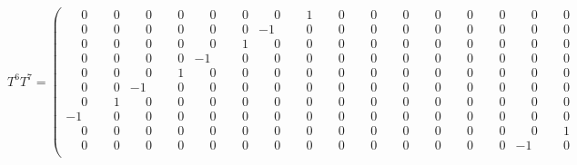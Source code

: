 \documentclass[10pt]{article}
\begin{document}
\[
T^{6}T^{7} = \left(\begin{smallmatrix}
\phantom{-}0 & \phantom{-}0 & \phantom{-}0 & \phantom{-}0 & \phantom{-}0 & \phantom{-}0 & \phantom{-}0 & \phantom{-}1 & \phantom{-}0 & \phantom{-}0 & \phantom{-}0 & \phantom{-}0 & \phantom{-}0 & \phantom{-}0 & \phantom{-}0 & \phantom{-}0 \\
\phantom{-}0 & \phantom{-}0 & \phantom{-}0 & \phantom{-}0 & \phantom{-}0 & \phantom{-}0 & -1 & \phantom{-}0 & \phantom{-}0 & \phantom{-}0 & \phantom{-}0 & \phantom{-}0 & \phantom{-}0 & \phantom{-}0 & \phantom{-}0 & \phantom{-}0 \\
\phantom{-}0 & \phantom{-}0 & \phantom{-}0 & \phantom{-}0 & \phantom{-}0 & \phantom{-}1 & \phantom{-}0 & \phantom{-}0 & \phantom{-}0 & \phantom{-}0 & \phantom{-}0 & \phantom{-}0 & \phantom{-}0 & \phantom{-}0 & \phantom{-}0 & \phantom{-}0 \\
\phantom{-}0 & \phantom{-}0 & \phantom{-}0 & \phantom{-}0 & -1 & \phantom{-}0 & \phantom{-}0 & \phantom{-}0 & \phantom{-}0 & \phantom{-}0 & \phantom{-}0 & \phantom{-}0 & \phantom{-}0 & \phantom{-}0 & \phantom{-}0 & \phantom{-}0 \\
\phantom{-}0 & \phantom{-}0 & \phantom{-}0 & \phantom{-}1 & \phantom{-}0 & \phantom{-}0 & \phantom{-}0 & \phantom{-}0 & \phantom{-}0 & \phantom{-}0 & \phantom{-}0 & \phantom{-}0 & \phantom{-}0 & \phantom{-}0 & \phantom{-}0 & \phantom{-}0 \\
\phantom{-}0 & \phantom{-}0 & -1 & \phantom{-}0 & \phantom{-}0 & \phantom{-}0 & \phantom{-}0 & \phantom{-}0 & \phantom{-}0 & \phantom{-}0 & \phantom{-}0 & \phantom{-}0 & \phantom{-}0 & \phantom{-}0 & \phantom{-}0 & \phantom{-}0 \\
\phantom{-}0 & \phantom{-}1 & \phantom{-}0 & \phantom{-}0 & \phantom{-}0 & \phantom{-}0 & \phantom{-}0 & \phantom{-}0 & \phantom{-}0 & \phantom{-}0 & \phantom{-}0 & \phantom{-}0 & \phantom{-}0 & \phantom{-}0 & \phantom{-}0 & \phantom{-}0 \\
-1 & \phantom{-}0 & \phantom{-}0 & \phantom{-}0 & \phantom{-}0 & \phantom{-}0 & \phantom{-}0 & \phantom{-}0 & \phantom{-}0 & \phantom{-}0 & \phantom{-}0 & \phantom{-}0 & \phantom{-}0 & \phantom{-}0 & \phantom{-}0 & \phantom{-}0 \\
\phantom{-}0 & \phantom{-}0 & \phantom{-}0 & \phantom{-}0 & \phantom{-}0 & \phantom{-}0 & \phantom{-}0 & \phantom{-}0 & \phantom{-}0 & \phantom{-}0 & \phantom{-}0 & \phantom{-}0 & \phantom{-}0 & \phantom{-}0 & \phantom{-}0 & \phantom{-}1 \\
\phantom{-}0 & \phantom{-}0 & \phantom{-}0 & \phantom{-}0 & \phantom{-}0 & \phantom{-}0 & \phantom{-}0 & \phantom{-}0 & \phantom{-}0 & \phantom{-}0 & \phantom{-}0 & \phantom{-}0 & \phantom{-}0 & \phantom{-}0 & -1 & \phantom{-}0 \\

\end{smallmatrix}\]
\end{document}
